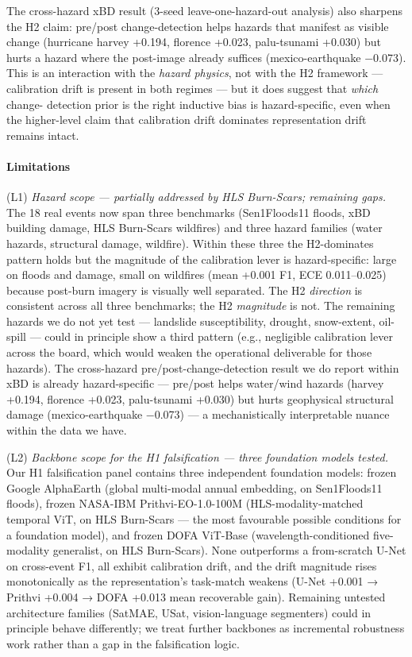 The cross-hazard xBD result (3-seed leave-one-hazard-out analysis) also
sharpens the H2 claim: pre/post change-detection helps hazards that
manifest as visible change (hurricane harvey +0.194, florence +0.023,
palu-tsunami +0.030) but hurts a hazard where the post-image already
suffices (mexico-earthquake −0.073). This is an interaction with the
\emph{hazard physics}, not with the H2 framework --- calibration drift is
present in both regimes --- but it does suggest that \emph{which} change-
detection prior is the right inductive bias is hazard-specific, even
when the higher-level claim that calibration drift dominates
representation drift remains intact.

\paragraph{Limitations}\label{limitations}

(L1) \emph{Hazard scope --- partially addressed by HLS Burn-Scars; remaining
gaps.} The 18 real events now span three benchmarks (Sen1Floods11 floods,
xBD building damage, HLS Burn-Scars wildfires) and three hazard families
(water hazards, structural damage, wildfire). Within these three the
H2-dominates pattern holds but the magnitude of the calibration lever is
hazard-specific: large on floods and damage, small on wildfires (mean
+0.001 F1, ECE 0.011--0.025) because post-burn imagery is visually well
separated. The H2 \emph{direction} is consistent across all three benchmarks;
the H2 \emph{magnitude} is not. The remaining hazards we do not yet test ---
landslide susceptibility, drought, snow-extent, oil-spill --- could in
principle show a third pattern (e.g., negligible calibration lever
across the board, which would weaken the operational deliverable for
those hazards). The cross-hazard pre/post-change-detection result we
do report within xBD is already hazard-specific --- pre/post helps
water/wind hazards (harvey +0.194, florence +0.023, palu-tsunami
+0.030) but hurts geophysical structural damage (mexico-earthquake
−0.073) --- a mechanistically interpretable nuance within the data we
have.

(L2) \emph{Backbone scope for the H1 falsification --- three foundation models
tested.} Our H1 falsification panel contains three independent
foundation models: frozen Google AlphaEarth (global multi-modal annual
embedding, on Sen1Floods11 floods), frozen NASA-IBM
Prithvi-EO-1.0-100M (HLS-modality-matched temporal ViT, on HLS
Burn-Scars --- the most favourable possible conditions for a foundation
model), and frozen DOFA ViT-Base (wavelength-conditioned five-modality
generalist, on HLS Burn-Scars). None outperforms a from-scratch U-Net
on cross-event F1, all exhibit calibration drift, and the drift
magnitude rises monotonically as the representation's task-match
weakens (U-Net +0.001 → Prithvi +0.004 → DOFA +0.013 mean recoverable
gain). Remaining untested architecture families (SatMAE, USat,
vision-language segmenters) could in principle behave differently; we
treat further backbones as incremental robustness work rather than a
gap in the falsification logic.

